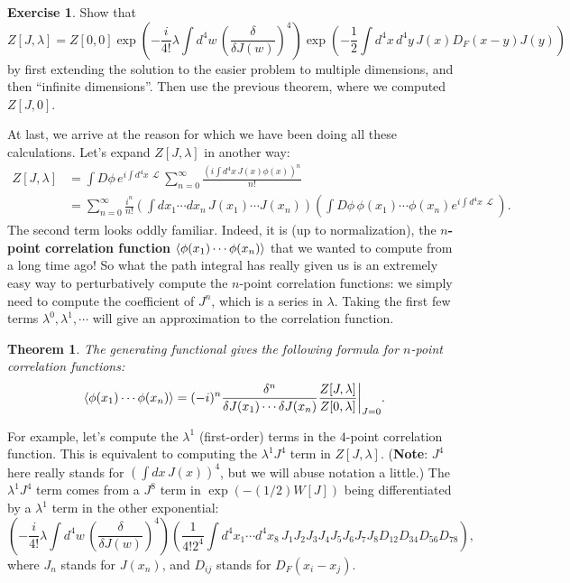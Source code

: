 \documentclass{report}
\theoremstyle{plain}
\newtheorem{theorem}{Theorem}[section]
\theoremstyle{definition}
\newtheorem{exercise}{Exercise}[section]
\theoremstyle{remark}
\DeclareMathOperator{\cL}{\mathcal{L}}
\begin{document}
\begin{exercise}
  Show that
  $$ Z[J, \lambda] = Z[0, 0] \exp\left(-\frac{i}{4!}\lambda \int d^4w \, \left(\frac{\delta}{\delta J(w)}\right)^4\right) \exp\left(-\frac{1}{2} \int d^4x \, d^4y \, J(x) D_F(x - y) J(y)\right) $$
  by first extending the solution to the easier problem to multiple
  dimensions, and then ``infinite dimensions''. Then use the previous
  theorem, where we computed $Z[J, 0]$.
\end{exercise}

At last, we arrive at the reason for which we have been doing all
these calculations. Let's expand $Z[J, \lambda]$ in another way:
\begin{align*}
  Z[J, \lambda]
  &= \int D\phi \, e^{i \int d^4x \, \cL} \sum_{n=0}^\infty \frac{\left(i \int d^4x \, J(x)\phi(x) \right)^n}{n!} \\
  &= \sum_{n=0}^\infty \frac{i^n}{n!} \left(\int dx_1 \cdots dx_n \, J(x_1) \cdots J(x_n) \right) \left(\int D\phi \, \phi(x_1) \cdots \phi(x_n) e^{i \int d^4x \, \cL}\right).
\end{align*}
The second term looks oddly familiar. Indeed, it is (up to
normalization), the {\bf $n$-point correlation function}
$\braket{\phi(x_1)\cdots \phi(x_n)}$ that we wanted to compute from a
long time ago! So what the path integral has really given us is an
extremely easy way to perturbatively compute the $n$-point correlation
functions: we simply need to compute the coefficient of $J^n$, which
is a series in $\lambda$. Taking the first few terms
$\lambda^0, \lambda^1, \cdots$ will give an approximation to the
correlation function.

\begin{theorem}
  The generating functional gives the following formula for $n$-point
  correlation functions:
  $$ \braket{\phi(x_1)\cdots \phi(x_n)} = (-i)^n \frac{\delta^n}{\delta J(x_1) \cdots \delta J(x_n)} \frac{Z[J,\lambda]}{Z[0,\lambda]}\bigg|_{J=0}. $$
\end{theorem}

For example, let's compute the $\lambda^1$ (first-order) terms in the
$4$-point correlation function. This is equivalent to computing the
$\lambda^1 J^4$ term in $Z[J, \lambda]$. ({\bf Note}: $J^4$ here
really stands for $\left(\int dx \, J(x)\right)^4$, but we will abuse
notation a little.) The $\lambda^1 J^4$ term comes from a $J^8$ term
in $\exp(-(1/2)W[J])$ being differentiated by a $\lambda^1$ term in
the other exponential:
$$ \left(-\frac{i}{4!} \lambda \int d^4w \, \left(\frac{\delta}{\delta J(w)}\right)^4 \right)\left(\frac{1}{4! 2^4} \int d^4x_1 \cdots d^4x_8 \, J_1 J_2 J_3 J_4 J_5 J_6 J_7 J_8 D_{12} D_{34} D_{56} D_{78}\right), $$
where $J_n$ stands for $J(x_n)$, and $D_{ij}$ stands for
$D_F(x_i - x_j)$.
\end{document}
